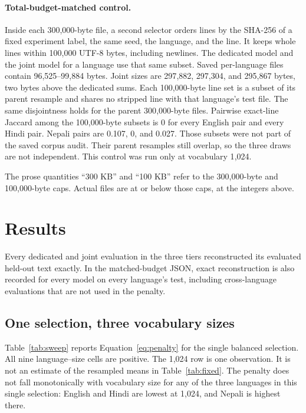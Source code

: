 \documentclass[10pt,twocolumn]{article}
\begin{document}
\paragraph{Total-budget-matched control.}
Inside each 300{,}000-byte file, a second selector orders lines by the SHA-256 of a fixed experiment label, the same seed, the language, and the line.
It keeps whole lines within 100{,}000 UTF-8 bytes, including newlines.
The dedicated model and the joint model for a language use that same subset.
Saved per-language files contain 96{,}525--99{,}884 bytes.
Joint sizes are 297{,}882, 297{,}304, and 295{,}867 bytes, two bytes above the dedicated sums.
Each 100{,}000-byte line set is a subset of its parent resample and shares no stripped line with that language's test file.
The same disjointness holds for the parent 300{,}000-byte files.
Pairwise exact-line Jaccard among the 100{,}000-byte subsets is 0 for every English pair and every Hindi pair.
Nepali pairs are 0.107, 0, and 0.027.
Those subsets were not part of the saved corpus audit.
Their parent resamples still overlap, so the three draws are not independent.
This control was run only at vocabulary 1{,}024.

The prose quantities ``300 KB'' and ``100 KB'' refer to the 300{,}000-byte and 100{,}000-byte caps.
Actual files are at or below those caps, at the integers above.

\section{Results}

Every dedicated and joint evaluation in the three tiers reconstructed its evaluated held-out text exactly.
In the matched-budget JSON, exact reconstruction is also recorded for every model on every language's test, including cross-language evaluations that are not used in the penalty.

\subsection{One selection, three vocabulary sizes}

Table~\ref{tab:sweep} reports Equation~\ref{eq:penalty} for the single balanced selection.
All nine language--size cells are positive.
The 1{,}024 row is one observation.
It is not an estimate of the resampled means in Table~\ref{tab:fixed}.
The penalty does not fall monotonically with vocabulary size for any of the three languages in this single selection: English and Hindi are lowest at 1{,}024, and Nepali is highest there.
\end{document}
